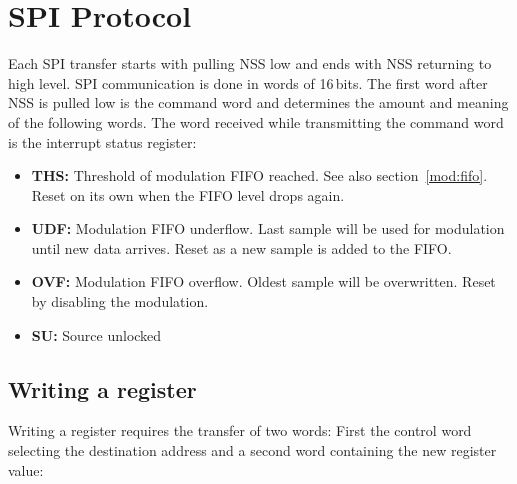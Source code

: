 \documentclass{article}
\newcommand{\bitrect}[2]{
  \begin{pgfonlayer}{foreground}
    \draw [thick] (0,0) rectangle (#1,1);
    \pgfmathsetmacro\result{#1-1}
    \foreach \x in {1,...,\result}
      \draw [thick] (\x,1) -- (\x, 0.8);
  \end{pgfonlayer}
  \bitlabels{#1}{#2}
}
\newcommand{\rwbits}[3]{
  \draw [thick] (#1,0) rectangle ++(#2,1) node[pos=0.5]{#3};
  \pgfmathsetmacro\start{#1+0.5}
  \pgfmathsetmacro\finish{#1+#2-0.5}
}
\newcommand{\robits}[3]{
  \begin{pgfonlayer}{background}
    \draw [thick, fill=lightgray] (#1,0) rectangle ++(#2,1) node[pos=0.5]{#3};
  \end{pgfonlayer}
  \pgfmathsetmacro\start{#1+0.5}
  \pgfmathsetmacro\finish{#1+#2-0.5}
}
\newcommand{\bitlabels}[2]{
  \foreach \bit in {1,...,#1}{
     \pgfmathsetmacro\result{#2}
     \node [above] at (\bit-0.5, 1) {\pgfmathprintnumber{\result}};
   }
}
\begin{document}
\section{SPI Protocol}
Each SPI transfer starts with pulling NSS low and ends with NSS returning to high level. SPI communication is done in words of 16\,bits. The first word after NSS is pulled low is the command word and determines the amount and meaning of the following words.
The word received while transmitting the command word is the interrupt status register:
\label{reg:status}
\begin{center}
\end{center}
\begin{itemize}
\item \textbf{THS:} Threshold of modulation FIFO reached. See also section~\ref{mod:fifo}. Reset on its own when the FIFO level drops again.
\item \textbf{UDF:} Modulation FIFO underflow. Last sample will be used for modulation until new data arrives. Reset as a new sample is added to the FIFO.
\item \textbf{OVF:} Modulation FIFO overflow. Oldest sample will be overwritten. Reset by disabling the modulation.
\item \textbf{SU:} Source unlocked
\end{itemize}
\subsection{Writing a register}
Writing a register requires the transfer of two words: First the control word selecting the destination address and a second word containing the new register value:
\begin{center}
\end{center}
\end{document}
